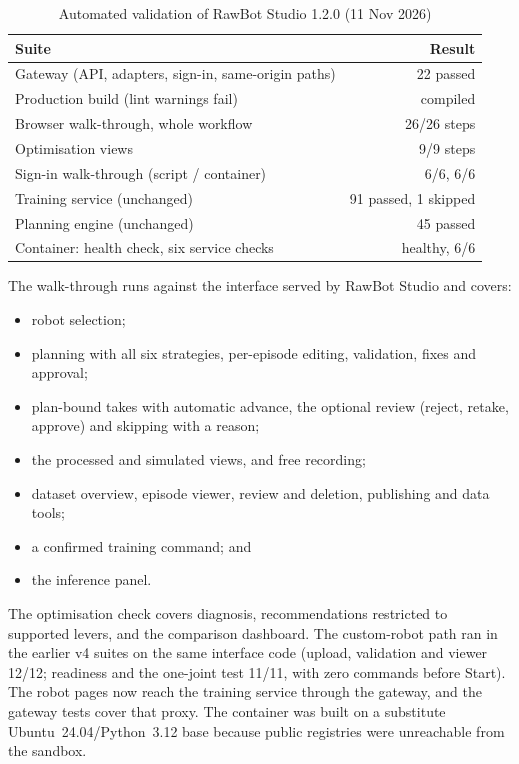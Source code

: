 \documentclass[conference]{IEEEtran}
\begin{document}
\begin{table}[t]
\centering
\caption{Automated validation of RawBot Studio 1.2.0 (11 Nov 2026)}
\label{tab:tests}
\setlength{\tabcolsep}{3pt}
\begin{tabular}{@{}lr@{}}
\toprule
Suite & Result \\
\midrule
Gateway (API, adapters, sign-in, same-origin paths) & 22 passed \\
Production build (lint warnings fail) & compiled \\
Browser walk-through, whole workflow & 26/26 steps \\
Optimisation views & 9/9 steps \\
Sign-in walk-through (script / container) & 6/6, 6/6 \\
Training service (unchanged) & 91 passed, 1 skipped \\
Planning engine (unchanged) & 45 passed \\
Container: health check, six service checks & healthy, 6/6 \\
\bottomrule
\end{tabular}
\end{table}

The walk-through runs against the interface served by RawBot Studio and covers:
\begin{itemize}
\item robot selection;
\item planning with all six strategies, per-episode editing, validation, fixes and approval;
\item plan-bound takes with automatic advance, the optional review (reject, retake, approve) and
skipping with a reason;
\item the processed and simulated views, and free recording;
\item dataset overview, episode viewer, review and deletion, publishing and data tools;
\item a confirmed training command; and
\item the inference panel.
\end{itemize}
The optimisation check covers diagnosis, recommendations restricted to supported levers, and
the comparison dashboard. The custom-robot path ran in the earlier v4 suites on the same
interface code (upload, validation and viewer 12/12; readiness and the one-joint test 11/11,
with zero commands before Start). The robot pages now reach the training service through the
gateway, and the gateway tests cover that proxy.
The container was built on a substitute Ubuntu~24.04/Python~3.12 base because public registries
were unreachable from the sandbox.
\end{document}
